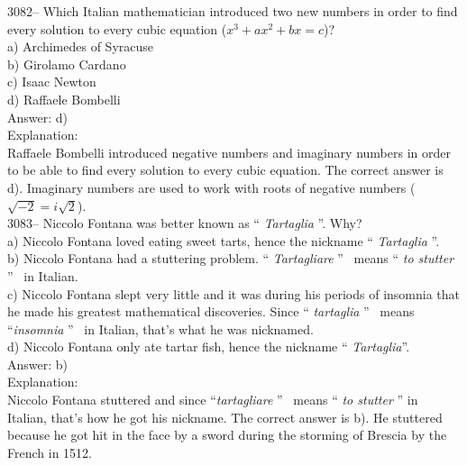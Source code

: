 \documentclass[letterpaper, 12pt]{article}
\begin{document}
3082-- Which Italian mathematician introduced two new numbers in order to find every solution to every cubic equation ($x{^3} + ax^{2} + bx = c$)?\\

a) Archimedes of Syracuse\\
b) Girolamo Cardano\\
c) Isaac Newton\\
d) Raffaele Bombelli\\

Answer: d)\\

Explanation:\\
Raffaele Bombelli introduced negative numbers and imaginary numbers in order to be able to find every solution to every cubic equation. The correct answer is d). Imaginary numbers are used to work with roots of negative numbers ($\sqrt{-2} = i\sqrt{2}$).\\



3083-- Niccolo Fontana was better known as `` \emph{Tartaglia} ''. Why?\\

a) Niccolo Fontana loved eating sweet tarts, hence the nickname `` \emph{Tartaglia} ''.\\
b) Niccolo Fontana had a stuttering problem. `` \emph{Tartagliare} '' \ means `` \emph{to stutter} '' \ in Italian.\\
c) Niccolo Fontana slept very little and it was during his periods of insomnia that he made his greatest mathematical discoveries. Since `` \emph{tartaglia} '' \ means ``\emph{insomnia} '' \ in Italian, that's what he was nicknamed.\\
d) Niccolo Fontana only ate tartar fish, hence the nickname `` \emph{Tartaglia}''.\\

Answer: b)\\

Explanation:\\
Niccolo Fontana stuttered and since ``\emph{tartagliare} '' \ means `` \emph{to stutter} '' in Italian, that's how he got his nickname. The correct answer is b). He stuttered because he got hit in the face by a sword during the storming of Brescia by the French in 1512.\\
\end{document}
